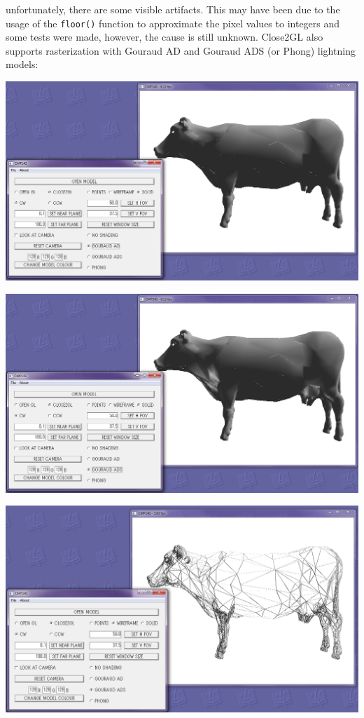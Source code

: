 \documentclass[12pt]{article}
\begin{document}
unfortunately, there are some visible artifacts. This may have been due to the usage of the \texttt{floor()} function to approximate the pixel values to integers and some tests were made, however, the cause is still unknown.
\newpage
Close2GL also supports rasterization with Gouraud AD and Gouraud ADS (or Phong) lightning models:
\begin{center}
\includegraphics[scale=0.45]{4.png}
\end{center}
\begin{center}
\includegraphics[scale=0.45]{5.png}
\end{center}
\begin{center}
\includegraphics[scale=0.45]{9.png}
\end{center}
\end{document}
